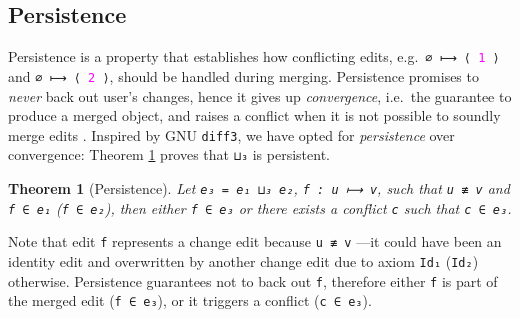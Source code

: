 \documentclass{sigplanconf}
\theoremstyle{plain}
\newtheorem{thm}{Theorem}
\newcommand{\num}[1]{\textcolor{magenta}{\texttt{#1}}}
\begin{document}
\subsection{Persistence}
\label{subsec:persistence}
Persistence is a property that establishes how conflicting edits,
e.g.\ \texttt{∅ ⟼ ⟨ \num{1} ⟩} and \texttt{∅ ⟼ ⟨
  \num{2} ⟩}, should be handled during merging.
%
Persistence promises to \emph{never} back out user's changes, hence it
gives up \emph{convergence}, i.e.\ the guarantee to produce a merged
object, and raises a conflict when it is not possible to soundly merge
edits \cite{Pierce07}.
%
Inspired by GNU \texttt{diff3}, we have opted for \emph{persistence}
over convergence: Theorem \ref{thm:persistence} proves that
\texttt{⊔₃} is persistent.



				
\begin{thm}[Persistence]
\label{thm:persistence}
Let \texttt{e₃ = e₁ ⊔₃ e₂}, \texttt{f : u ⟼ v}, such that \texttt{u ≢
  v} and \texttt{f ∈ e₁} (\texttt{f ∈ e₂}), then either \texttt{f ∈
  e₃} or there exists a conflict \texttt{c} such that \texttt{c ∈ e₃}.
\end{thm}
Note that edit \texttt{f} represents a change edit because \texttt{u ≢
  v} ---it could have been an identity edit and overwritten by another
change edit due to axiom \texttt{Id₁} (\texttt{Id₂}) otherwise.
%
Persistence guarantees not to back out \texttt{f}, therefore either
\texttt{f} is part of the merged edit (\texttt{f ∈ e₃}), or it
triggers a conflict (\texttt{c ∈ e₃}).
%
\end{document}
